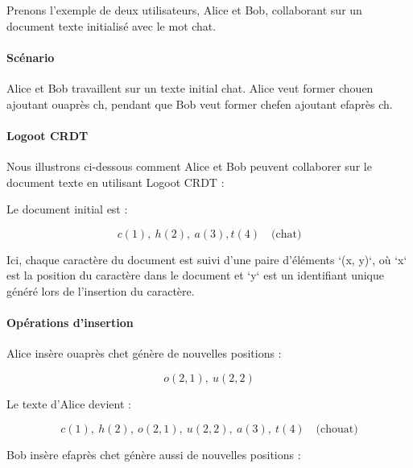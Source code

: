Prenons l'exemple de deux utilisateurs, Alice et Bob, collaborant sur un document texte initialisé avec le mot \guillemotleft chat\guillemotright.

\paragraph{Scénario}
Alice et Bob travaillent sur un texte initial \guillemotleft chat\guillemotright. Alice veut former \guillemotleft chou\guillemotright en ajoutant \guillemotleft ou\guillemotright après \guillemotleft ch\guillemotright, pendant que Bob veut former \guillemotleft chef\guillemotright en ajoutant \guillemotleft ef\guillemotright après \guillemotleft ch\guillemotright.

\paragraph{Logoot \Gls{CRDT}}
Nous illustrons ci-dessous comment Alice et Bob peuvent collaborer sur le document texte en utilisant Logoot \Gls{CRDT} :

Le document initial est :

\begin{equation}
    c(1),\ h(2), \ a(3), t(4) \quad \text{(chat)}
\end{equation}

Ici, chaque caractère du document est suivi d'une paire d'éléments `(x, y)`, où `x` est la position du caractère dans le document et `y` est un identifiant unique généré lors de l'insertion du caractère.

\paragraph{Opérations d'insertion}
Alice insère \guillemotleft ou\guillemotright après \guillemotleft ch\guillemotright et génère de nouvelles positions :

\begin{equation}
    o(2, 1), \ u(2, 2)
\end{equation}

Le texte d'Alice devient :

\begin{equation}
    c(1), \ h(2), \ o(2, 1), \ u(2, 2), \ a(3), \ t(4) \quad \text{(chouat)}
\end{equation}

Bob insère \guillemotleft ef\guillemotright après \guillemotleft ch\guillemotright et génère aussi de nouvelles positions :

